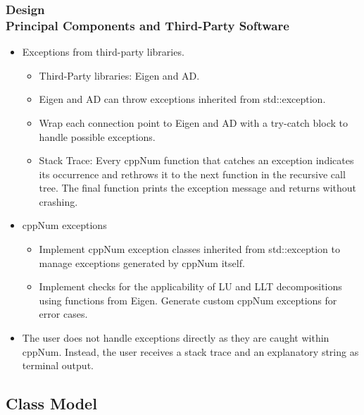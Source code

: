 \documentclass[ucs,10pt]{beamer}
\begin{document}
\begin{frame}
\frametitle{Design \\
	\small \color{rwth-blue} Principal Components and Third-Party Software}
	\begin{itemize}
		\item Exceptions from third-party libraries.
		\begin{itemize}
			\item Third-Party libraries: Eigen and AD.
			\item Eigen and AD can throw exceptions inherited from std::exception.
			\item Wrap each connection point to Eigen and AD with a try-catch block to handle possible exceptions.
			\item Stack Trace: Every cppNum function that catches an exception indicates its occurrence and rethrows it to the next function in the recursive call tree. The final function prints the exception message and returns without crashing.
		\end{itemize}
		\item cppNum exceptions
		\begin{itemize}
			\item Implement cppNum exception classes inherited from std::exception to manage exceptions generated by cppNum itself.
			\item Implement checks for the applicability of LU and LLT decompositions using functions from Eigen. Generate custom cppNum exceptions for error cases.
		\end{itemize}
		\item The user does not handle exceptions directly as they are caught within cppNum. Instead, the user receives a stack trace and an explanatory string as terminal output.
	\end{itemize}
\end{frame}

\subsection{Class Model}
\end{document}
